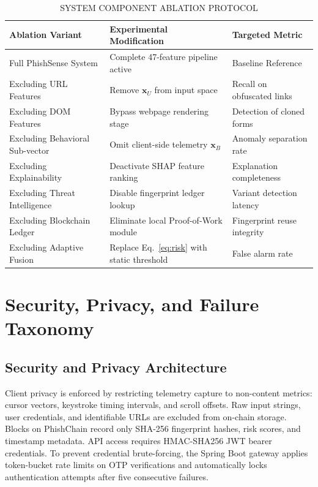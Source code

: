 \documentclass[conference]{IEEEtran}
\begin{document}
\begin{table}[!t]
\caption{SYSTEM COMPONENT ABLATION PROTOCOL}
\label{tab:ablation}
\centering
\scriptsize
\setlength{\tabcolsep}{3pt}
\begin{tabularx}{\columnwidth}{|>{\raggedright\arraybackslash}p{}|>{\raggedright\arraybackslash}X|>{\raggedright\arraybackslash}p{}|}
\hline
\textbf{Ablation Variant} & \textbf{Experimental Modification} & \textbf{Targeted Metric} \\ \hline
Full PhishSense System    & Complete 47-feature pipeline active & Baseline Reference \\ \hline
Excluding URL Features    & Remove $\mathbf{x}_U$ from input space & Recall on obfuscated links \\ \hline
Excluding DOM Features    & Bypass webpage rendering stage & Detection of cloned forms \\ \hline
Excluding Behavioral Sub-vector & Omit client-side telemetry $\mathbf{x}_B$ & Anomaly separation rate \\ \hline
Excluding Explainability  & Deactivate SHAP feature ranking & Explanation completeness \\ \hline
Excluding Threat Intelligence & Disable fingerprint ledger lookup & Variant detection latency \\ \hline
Excluding Blockchain Ledger & Eliminate local Proof-of-Work module & Fingerprint reuse integrity \\ \hline
Excluding Adaptive Fusion & Replace Eq.~\eqref{eq:risk} with static threshold & False alarm rate \\ \hline
\end{tabularx}
\end{table}

\section{Security, Privacy, and Failure Taxonomy}

\subsection{Security and Privacy Architecture}
Client privacy is enforced by restricting telemetry capture to non-content metrics: cursor vectors,
keystroke timing intervals, and scroll offsets.
Raw input strings, user credentials, and identifiable URLs are excluded from on-chain storage.
Blocks on PhishChain record only SHA-256 fingerprint hashes, risk scores, and timestamp metadata.
API access requires HMAC-SHA256 JWT bearer credentials.
To prevent credential brute-forcing, the Spring Boot gateway applies token-bucket rate limits on
OTP verifications and automatically locks authentication attempts after five consecutive failures.
\end{document}
